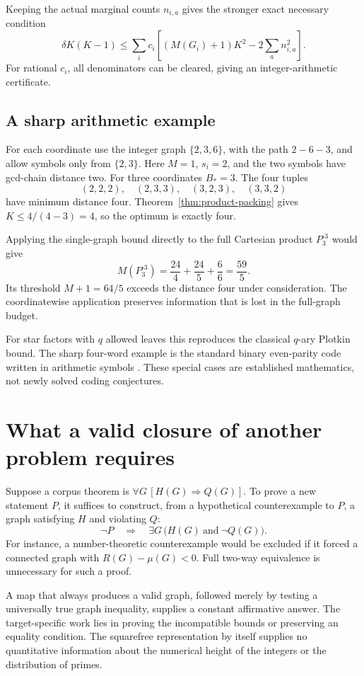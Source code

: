 \documentclass[11pt,a4paper]{article}
\theoremstyle{definition}
\theoremstyle{remark}
\numberwithin{equation}{section}
\begin{document}
Keeping the actual marginal counts $n_{i,a}$ gives the stronger exact
necessary condition
\[
\delta K(K-1)\le\sum_i c_i
\left[(M(G_i)+1)K^2-2\sum_a n_{i,a}^2\right].
\]
For rational $c_i$, all denominators can be cleared, giving an
integer-arithmetic certificate.

\subsection{A sharp arithmetic example}

For each coordinate use the integer graph $\{2,3,6\}$, with the path
$2-6-3$, and allow symbols only from $\{2,3\}$.
Here $M=1$, $s_i=2$, and the two symbols have gcd-chain distance two.
For three coordinates $B_*=3$. The four tuples
\[
(2,2,2),\quad(2,3,3),\quad(3,2,3),\quad(3,3,2)
\]
have minimum distance four. Theorem~\ref{thm:product-packing} gives
$K\le4/(4-3)=4$, so the optimum is exactly four.

Applying the single-graph bound directly to the full Cartesian product
$P_3^{\square3}$ would give
\[
M(P_3^{\square3})=\frac{24}4+\frac{24}5+\frac66=\frac{59}5.
\]
Its threshold $M+1=64/5$ exceeds the distance four under consideration.
The coordinatewise application preserves information that is lost in
the full-graph budget.

For star factors with $q$ allowed leaves this reproduces the classical
$q$-ary Plotkin bound. The sharp four-word example is the standard
binary even-parity code written in arithmetic symbols
\cite{plotkin}. These special cases are established mathematics,
not newly solved coding conjectures.

\section{What a valid closure of another problem requires}

Suppose a corpus theorem is $\forall G\,[H(G)\Rightarrow Q(G)]$.
To prove a new statement $P$, it suffices to construct, from a
hypothetical counterexample to $P$, a graph satisfying $H$ and
violating $Q$:
\[
\neg P\quad\Longrightarrow\quad
\exists G\,\bigl(H(G)\ \text{and}\ \neg Q(G)\bigr).
\]
For instance, a number-theoretic counterexample would be excluded if
it forced a connected graph with $R(G)-\mu(G)<0$.
Full two-way equivalence is unnecessary for such a proof.

A map that always produces a valid graph, followed merely by testing
a universally true graph inequality, supplies a constant affirmative
answer. The target-specific work lies in proving the incompatible
bounds or preserving an equality condition. The squarefree
representation by itself supplies no quantitative information about
the numerical height of the integers or the distribution of primes.
\end{document}
